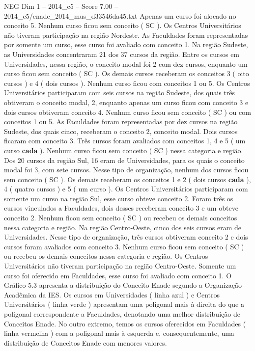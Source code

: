 \begin{textsample}{NEG Dim 1 – 2014\_c5 – Score 7.00 – 2014\_c5/enade\_2014\_mus\_d33546da45.txt}
Apenas um curso foi alocado no conceito 5.
Nenhum curso ficou sem conceito ( SC ).
Os Centros Universitários não tiveram participação na região Nordeste.
As Faculdades foram representadas por somente um curso, esse curso foi avaliado com conceito 1.
Na região Sudeste, as Universidades concentraram 21 dos 37 cursos da região.
Entre os cursos em Universidades, nessa região, o conceito modal foi 2 com dez cursos, enquanto um curso ficou sem conceito ( SC ).
Os demais cursos receberam os conceitos 3 ( oito cursos ) e 4 ( dois cursos ).
Nenhum curso ficou com conceitos 1 ou 5.
Os Centros Universitários participaram com seis cursos na região Sudeste, dos quais três obtiveram o conceito modal, 2, enquanto apenas um curso ficou com conceito 3 e dois cursos obtiveram conceito 4.
Nenhum curso ficou sem conceito ( SC ) ou com conceitos 1 ou 5.
As Faculdades foram representadas por dez cursos na região Sudeste, dos quais cinco, receberam o conceito 2, conceito modal.
Dois cursos ficaram com conceito 3.
Três cursos foram avaliados com conceitos 1, 4 e 5 ( um curso \textbf{cada} ).
Nenhum curso ficou sem conceito ( SC ) nessa categoria e região.
Dos 20 cursos da região Sul, 16 eram de Universidades, para os quais o conceito modal foi 3, com sete cursos.
Nesse tipo de organização, nenhum dos cursos ficou sem conceito ( SC ).
Os demais receberam os conceitos 1 e 2 ( dois cursos \textbf{cada} ), 4 ( quatro cursos ) e 5 ( um curso ).
Os Centros Universitários participaram com somente um curso na região Sul, esse curso obteve conceito 2.
Foram três os cursos vinculados a Faculdades, dois desses receberam conceito 3 e um obteve conceito 2.
Nenhum ficou sem conceito ( SC ) ou recebeu os demais conceitos nessa categoria e região.
Na região Centro-Oeste, cinco dos seis cursos eram de Universidades.
Nesse tipo de organização, três cursos obtiveram conceito 2 e dois cursos foram avaliados com conceito 3.
Nenhum curso ficou sem conceito ( SC ) ou recebeu os demais conceitos nessa categoria e região.
Os Centros Universitários não tiveram participação na região Centro-Oeste.
Somente um curso foi oferecido em Faculdades, esse curso foi avaliado com conceito 1.
O Gráfico 5.3 apresenta a distribuição do Conceito Enade segundo a Organização Acadêmica da IES.
Os cursos em Universidades ( linha azul ) e Centros Universitários ( linha verde ) apresentam uma poligonal mais à direita do que a poligonal correspondente a Faculdades, denotando uma melhor distribuição de Conceitos Enade.
No outro extremo, temos os cursos oferecidos em Faculdades ( linha vermelha ) com a poligonal mais à esquerda e, consequentemente, uma distribuição de Conceitos Enade com menores valores.

\end{textsample}
